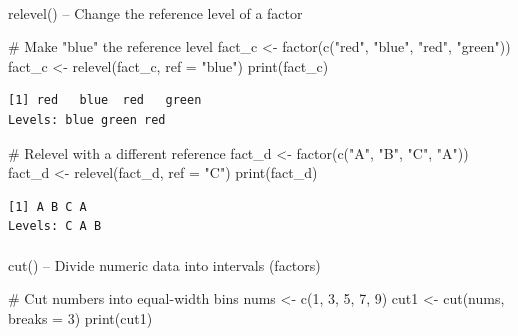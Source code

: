 \documentclass[
  letterpaper,
  DIV=11,
  numbers=noendperiod]{scrartcl}
\makeatletter
\let\oldparagraph\paragraph
\renewcommand{\paragraph}{
    \@ifstar
      \xxxParagraphStar
      \xxxParagraphNoStar
  }
\newcommand{\xxxParagraphStar}[1]{\oldparagraph*{#1}\mbox{}}
\newcommand{\xxxParagraphNoStar}[1]{\oldparagraph{#1}\mbox{}}
\newenvironment{Shaded}{\begin{snugshade}}{\end{snugshade}}
\newcommand{\AttributeTok}[1]{\textcolor[rgb]{0.40,0.45,0.13}{#1}}
\newcommand{\CommentTok}[1]{\textcolor[rgb]{0.37,0.37,0.37}{#1}}
\newcommand{\DecValTok}[1]{\textcolor[rgb]{0.68,0.00,0.00}{#1}}
\newcommand{\FunctionTok}[1]{\textcolor[rgb]{0.28,0.35,0.67}{#1}}
\newcommand{\NormalTok}[1]{\textcolor[rgb]{0.00,0.23,0.31}{#1}}
\newcommand{\OtherTok}[1]{\textcolor[rgb]{0.00,0.23,0.31}{#1}}
\newcommand{\StringTok}[1]{\textcolor[rgb]{0.13,0.47,0.30}{#1}}
\makeatother
\begin{document}
\paragraph{relevel() -- Change the reference level of a
factor}\label{relevel-change-the-reference-level-of-a-factor}

\begin{Shaded}
\begin{Highlighting}[]
\CommentTok{\#   Make "blue" the reference level}
\NormalTok{fact\_c }\OtherTok{\textless{}{-}} \FunctionTok{factor}\NormalTok{(}\FunctionTok{c}\NormalTok{(}\StringTok{"red"}\NormalTok{, }\StringTok{"blue"}\NormalTok{, }\StringTok{"red"}\NormalTok{, }\StringTok{"green"}\NormalTok{))}
\NormalTok{fact\_c }\OtherTok{\textless{}{-}} \FunctionTok{relevel}\NormalTok{(fact\_c, }\AttributeTok{ref =} \StringTok{"blue"}\NormalTok{)}
\FunctionTok{print}\NormalTok{(fact\_c)}
\end{Highlighting}
\end{Shaded}

\begin{verbatim}
[1] red   blue  red   green
Levels: blue green red
\end{verbatim}

\begin{Shaded}
\begin{Highlighting}[]
\CommentTok{\#   Relevel with a different reference}
\NormalTok{fact\_d }\OtherTok{\textless{}{-}} \FunctionTok{factor}\NormalTok{(}\FunctionTok{c}\NormalTok{(}\StringTok{"A"}\NormalTok{, }\StringTok{"B"}\NormalTok{, }\StringTok{"C"}\NormalTok{, }\StringTok{"A"}\NormalTok{))}
\NormalTok{fact\_d }\OtherTok{\textless{}{-}} \FunctionTok{relevel}\NormalTok{(fact\_d, }\AttributeTok{ref =} \StringTok{"C"}\NormalTok{)}
\FunctionTok{print}\NormalTok{(fact\_d)}
\end{Highlighting}
\end{Shaded}

\begin{verbatim}
[1] A B C A
Levels: C A B
\end{verbatim}

\paragraph{cut() -- Divide numeric data into intervals
(factors)}\label{cut-divide-numeric-data-into-intervals-factors}

\begin{Shaded}
\begin{Highlighting}[]
\CommentTok{\#   Cut numbers into equal{-}width bins}
\NormalTok{nums }\OtherTok{\textless{}{-}} \FunctionTok{c}\NormalTok{(}\DecValTok{1}\NormalTok{, }\DecValTok{3}\NormalTok{, }\DecValTok{5}\NormalTok{, }\DecValTok{7}\NormalTok{, }\DecValTok{9}\NormalTok{)}
\NormalTok{cut1 }\OtherTok{\textless{}{-}} \FunctionTok{cut}\NormalTok{(nums, }\AttributeTok{breaks =} \DecValTok{3}\NormalTok{)}
\FunctionTok{print}\NormalTok{(cut1)}
\end{Highlighting}
\end{Shaded}
\end{document}
